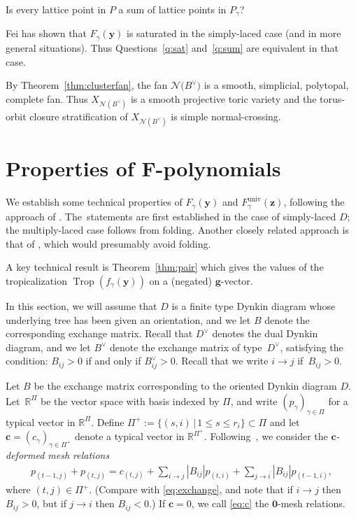 \documentclass[pdftex]{sigma}%
\def\R{{\mathbb R}}
\def\univ{{\operatorname{univ}}}
\def\z{{\mathbf z}}
\def\y{{\mathbf y}}
\def\N{{\mathcal{N}}}
\def\Trop{\operatorname{Trop}}
\def\g{{\mathbf g}}
\def\c{{\mathbf c}}
\numberwithin{equation}{section}
\begin{document}
\begin{question}\label{q:sum}
Is every lattice point in $P$ a sum of lattice points in $P_\gamma$?
\end{question}

Fei \cite{Fei} has shown that $F_\gamma(\y)$ is saturated in the simply-laced case (and in more general situations). Thus Questions~\ref{q:sat} and~\ref{q:sum} are equivalent in that case.

\bigskip{} %
By Theorem~\ref{thm:clusterfan}, the fan $\N\big(B^\vee\big)$ is a smooth, simplicial, polytopal, complete fan. Thus $X_{\N(B^\vee)}$ is a smooth projective toric variety and the torus-orbit closure stratification of $X_{\N(B^\vee)}$ is simple normal-crossing.

\section[Properties of F-polynomials]
{Properties of $\boldsymbol F$-polynomials}\label{sec:F}

We establish some technical properties of $F_\gamma(\y)$ and $F^\univ_\gamma(\z)$, following the approach of \cite{BDMTY}. The~statements are first established in the case of simply-laced $D$; the multiply-laced case follows from folding. Another closely related approach is that of \cite{PPPP}, which would presumably avoid folding.

A key technical result is Theorem~\ref{thm:pair} which gives the values of the tropicalization $\Trop(f_\gamma(\y))$ on a (negated) $\g$-vector.

In this section, we will assume that $D$ is a finite type Dynkin diagram whose underlying tree has been given an orientation, and we let $B$ denote the corresponding exchange matrix. Recall that $D^\vee$ denotes the dual Dynkin diagram, and we let $B^\vee$ denote the exchange matrix of type~$D^\vee$, satisfying the condition: $B_{ij} > 0$ if and only if $B^\vee_{ij} > 0$. Recall that we write $i \to j$ if~$B_{ij} > 0$.

\bigskip{}
Let $B$ be the exchange matrix corresponding to the oriented Dynkin diagram $D$. Let~$\R^\Pi$ be the vector space with basis indexed by $\Pi$, and write $(p_\gamma)_{\gamma \in \Pi}$ for a typical vector in $\R^\Pi$. Define $\Pi^+ :=\{(s,i) \,|\, 1\leq s \leq r_i\} \subset \Pi$ and let $\c = (c_\gamma)_{\gamma \in \Pi^+}$ denote a typical vector in $\R^{\Pi^+}$. Following~\cite{BDMTY}, we consider the \emph{$\c$-deformed mesh relations}
\begin{gather}\label{eq:c}
p_{(t-1,j)} + p_{(t,j)} = c_{(t,j)} + \sum_{i \to j} |B_{ij}| p_{(t,i)}+ \sum_{j \to i} |B_{ij}| p_{(t-1,i)},
\end{gather}
where $(t,j) \in \Pi^+$. (Compare with \eqref{eq:exchange}, and note that if $i \to j$ then $B_{ij} >0$, but if $j \to i$ then $B_{ij} < 0$.) If $\c = 0$, we call \eqref{eq:c} the ${\mathbf 0}$-mesh relations.
\end{document}
